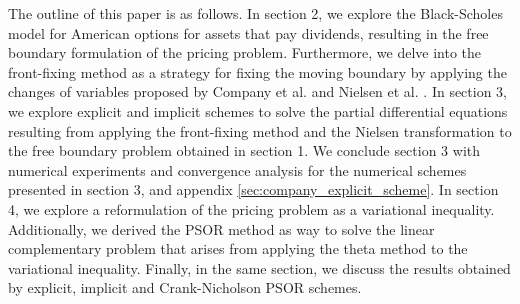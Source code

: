 The outline of this paper is as follows. In section 2, we explore the Black-Scholes model for American options for assets that pay dividends, resulting in the free boundary formulation of the pricing problem. Furthermore, we delve into the front-fixing method as a strategy for fixing the moving boundary by applying the changes of variables proposed by Company et al. \cite{company_egorova_jodar_2014} and Nielsen et al. \cite{nielsen_2001}. In section 3, we explore explicit and implicit schemes to solve the partial differential equations resulting from applying the front-fixing method and the Nielsen transformation to the free boundary problem obtained in section 1. We conclude section 3 with numerical experiments and convergence analysis for the numerical schemes presented in section 3, and appendix \ref{sec:company_explicit_scheme}. In section 4, we explore a reformulation of the pricing problem as a variational inequality. Additionally, we derived the PSOR method as way to solve the linear complementary problem that arises from applying the theta method to the variational inequality. Finally, in the same section, we discuss the results obtained by explicit, implicit and Crank-Nicholson PSOR schemes.
